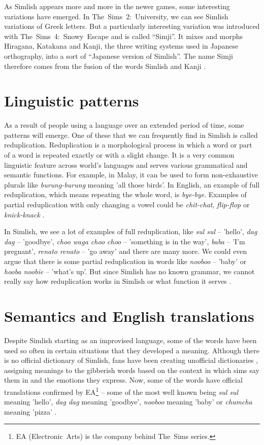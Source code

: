 \documentclass[11pt]{article}
\begin{document}
As Simlish appears more and more in the newer games, some interesting variations have emerged.
In The~Sims~2:~University, we can see Simlish variations of Greek letters.
But a particularly interesting variation was introduced with The~Sims~4:~Snowy~Escape and is called ``Simji''. It mixes and morphs Hiragana, Katakana and Kanji, the three writing systems used in Japanese orthography, into a sort of ``Japanese version of Simlish''. The name Simji therefore comes from the fusion of the words Simlish and Kanji \cite{kirce2024language}. 

\section*{Linguistic patterns}

As a result of people using a language over an extended period of time, some patterns will emerge. One of these that we can frequently find in Simlish is called reduplication. Reduplication is a morphological process in which a word or part of a word is repeated exactly or with a slight change. It is a very common linguistic feature across world's languages and serves various grammatical and semantic functions. For example, in Malay, it can be used to form non-exhaustive plurals like \textit{burung-burung} meaning 'all those birds'. In English, an example of full reduplication, which means repeating the whole word, is \textit{bye-bye}. Examples of partial reduplication with only changing a vowel could be \textit{chit-chat}, \textit{flip-flop} or \textit{knick-knack} \cite{kirce2024language}.

In Simlish, we see a lot of examples of full reduplication, like \textit{sul sul} -- 'hello', \textit{dag dag} -- 'goodbye', \textit{choo waga choo choo} -- 'something is in the way', \textit{baba} -- 'I'm pregnant', \textit{renato renato} -- 'go away' and there are many more.
We could even argue that there is some partial reduplication in words like \textit{nooboo} -- 'baby' or \textit{hooba noobie} -- 'what's up'. But since Simlish has no known grammar, we cannot really say how reduplication works in Simlish or what function it serves \cite{kirce2024language}.

\section*{Semantics and English translations}

Despite Simlish starting as an improvised language, some of the words have been used so often in certain situations that they developed a meaning. Although there is no official dictionary of Simlish, fans have been creating unofficial dictionaries \cite{simlish2012simlish, beck2023simlish}, assigning meanings to the gibberish words based on the context in which sims say them in and the emotions they express.
Now, some of the words have official translations confirmed by EA\footnote{EA (Electronic~Arts) is the company behind The~Sims series.} -- some of the most well known being \textit{sul sul} meaning 'hello', \textit{dag dag} meaning 'goodbye', \textit{nooboo} meaning 'baby' or \textit{chumcha} meaning 'pizza' \cite{ea2004thesims2.com}.
\end{document}
